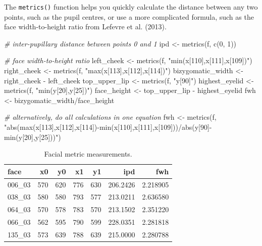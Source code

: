 \documentclass[
  man,floatsintext]{apa6}
\newenvironment{Shaded}{\begin{snugshade}}{\end{snugshade}}
\newcommand{\CommentTok}[1]{\textcolor[rgb]{0.56,0.35,0.01}{\textit{#1}}}
\newcommand{\DecValTok}[1]{\textcolor[rgb]{0.00,0.00,0.81}{#1}}
\newcommand{\FunctionTok}[1]{\textcolor[rgb]{0.00,0.00,0.00}{#1}}
\newcommand{\NormalTok}[1]{#1}
\newcommand{\OtherTok}[1]{\textcolor[rgb]{0.56,0.35,0.01}{#1}}
\newcommand{\SpecialCharTok}[1]{\textcolor[rgb]{0.00,0.00,0.00}{#1}}
\newcommand{\StringTok}[1]{\textcolor[rgb]{0.31,0.60,0.02}{#1}}
\begin{document}
The \texttt{metrics()} function helps you quickly calculate the distance between any two points, such as the pupil centres, or use a more complicated formula, such as the face width-to-height ratio from Lefevre et al. (2013).

\begin{Shaded}
\begin{Highlighting}[]
\CommentTok{\# inter{-}pupillary distance between points 0 and 1}
\NormalTok{ipd }\OtherTok{\textless{}{-}} \FunctionTok{metrics}\NormalTok{(f, }\FunctionTok{c}\NormalTok{(}\DecValTok{0}\NormalTok{, }\DecValTok{1}\NormalTok{))}

\CommentTok{\# face width{-}to{-}height ratio}
\NormalTok{left\_cheek }\OtherTok{\textless{}{-}} \FunctionTok{metrics}\NormalTok{(f, }\StringTok{"min(x[110],x[111],x[109])"}\NormalTok{)}
\NormalTok{right\_cheek }\OtherTok{\textless{}{-}} \FunctionTok{metrics}\NormalTok{(f, }\StringTok{"max(x[113],x[112],x[114])"}\NormalTok{)}
\NormalTok{bizygomatic\_width }\OtherTok{\textless{}{-}}\NormalTok{ right\_cheek }\SpecialCharTok{{-}}\NormalTok{ left\_cheek}
\NormalTok{top\_upper\_lip }\OtherTok{\textless{}{-}} \FunctionTok{metrics}\NormalTok{(f, }\StringTok{"y[90]"}\NormalTok{)}
\NormalTok{highest\_eyelid }\OtherTok{\textless{}{-}} \FunctionTok{metrics}\NormalTok{(f, }\StringTok{"min(y[20],y[25])"}\NormalTok{)}
\NormalTok{face\_height }\OtherTok{\textless{}{-}}\NormalTok{ top\_upper\_lip }\SpecialCharTok{{-}}\NormalTok{ highest\_eyelid}
\NormalTok{fwh }\OtherTok{\textless{}{-}}\NormalTok{ bizygomatic\_width}\SpecialCharTok{/}\NormalTok{face\_height}

\CommentTok{\# alternatively, do all calculations in one equation}
\NormalTok{fwh }\OtherTok{\textless{}{-}} \FunctionTok{metrics}\NormalTok{(f, }\StringTok{"abs(max(x[113],x[112],x[114]){-}min(x[110],x[111],x[109]))/abs(y[90]{-}min(y[20],y[25]))"}\NormalTok{)}
\end{Highlighting}
\end{Shaded}

\begin{table}

\caption{\label{tab:metrics}Facial metric measurements.}
\centering
\begin{tabular}[t]{l|r|r|r|r|r|r}
\hline
face & x0 & y0 & x1 & y1 & ipd & fwh\\
\hline
006\_03 & 570 & 620 & 776 & 630 & 206.2426 & 2.218905\\
\hline
038\_03 & 580 & 580 & 793 & 577 & 213.0211 & 2.636580\\
\hline
064\_03 & 570 & 578 & 783 & 570 & 213.1502 & 2.351220\\
\hline
066\_03 & 562 & 595 & 790 & 599 & 228.0351 & 2.281818\\
\hline
135\_03 & 573 & 639 & 788 & 639 & 215.0000 & 2.280788\\
\hline
\end{tabular}
\end{table}
\end{document}
